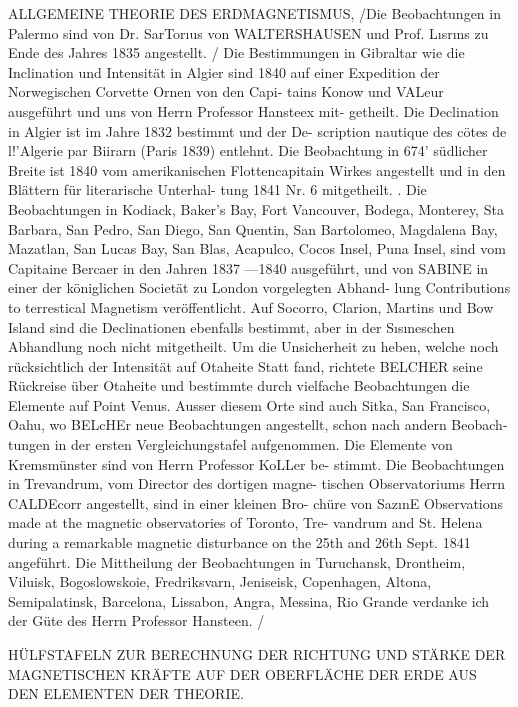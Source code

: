 \documentclass[12pt,a4paper]{article}
\begin{document}
ALLGEMEINE THEORIE DES ERDMAGNETISMUS, /Die Beobachtungen in Palermo sind von Dr. SarTor\i{}us von WALTERSHAUSEN und Prof. L\i{}sr\i{}ns zu Ende des Jahres 1835 angestellt. / Die Bestimmungen in Gibraltar wie die Inclination und Intensität in Algier sind 1840 auf einer Expedition der Norwegischen Corvette Ornen von den Capi- tains Konow und VALeur ausgeführt und uns von Herrn Professor Hansteex mit- getheilt. Die Declination in Algier ist im Jahre 1832 bestimmt und der De- scription nautique des cötes de l!'Algerie par Biirarn (Paris 1839) entlehnt. Die Beobachtung in 67\textdegree{}4' südlicher Breite ist 1840 vom amerikanischen Flottencapitain Wirkes angestellt und in den Blättern für literarische Unterhal- tung 1841 Nr. 6 mitgetheilt. . Die Beobachtungen in Kodiack, Baker's Bay, Fort Vancouver, Bodega, Monterey, Sta Barbara, San Pedro, San Diego, San Quentin, San Bartolomeo, Magdalena Bay, Mazatlan, San Lucas Bay, San Blas, Acapulco, Cocos Insel, Puna Insel, sind vom Capitaine Bercaer in den Jahren 1837 ---1840 ausgeführt, und von SABINE in einer der königlichen Societät zu London vorgelegten Abhand- lung Contributions to terrestical Magnetism veröffentlicht. Auf Socorro, Clarion, Martins und Bow Island sind die Declinationen ebenfalls bestimmt, aber in der S\i{}s\i{}neschen Abhandlung noch nicht mitgetheilt. Um die Unsicherheit zu heben, welche noch rücksichtlich der Intensität auf Otaheite Statt fand, richtete BELCHER seine Rückreise über Otaheite und bestimmte durch vielfache Beobachtungen die Elemente auf Point Venus. Ausser diesem Orte sind auch Sitka, San Francisco, Oahu, wo BELcHEr neue Beobachtungen angestellt, schon nach andern Beobach- tungen in der ersten Vergleichungstafel aufgenommen. Die Elemente von Kremsmünster sind von Herrn Professor KoLLer be- stimmt. Die Beobachtungen in Trevandrum, vom Director des dortigen magne- tischen Observatoriums Herrn CALDEcorr angestellt, sind in einer kleinen Bro- chüre von Saz\i{}nE Observations made at the magnetic observatories of Toronto, Tre- vandrum and St. Helena during a remarkable magnetic disturbance on the 25th and 26th Sept. 1841 angeführt. Die Mittheilung der Beobachtungen in Turuchansk, Drontheim, Viluisk, Bogoslowskoie, Fredriksvarn, Jeniseisk, Copenhagen, Altona, Semipalatinsk, Barcelona, Lissabon, Angra, Messina, Rio Grande verdanke ich der Güte des Herrn Professor Hansteen. /


\newpage


HÜLFSTAFELN ZUR BERECHNUNG DER RICHTUNG UND STÄRKE DER MAGNETISCHEN KRÄFTE AUF DER OBERFLÄCHE DER ERDE AUS DEN ELEMENTEN DER THEORIE.
\end{document}
